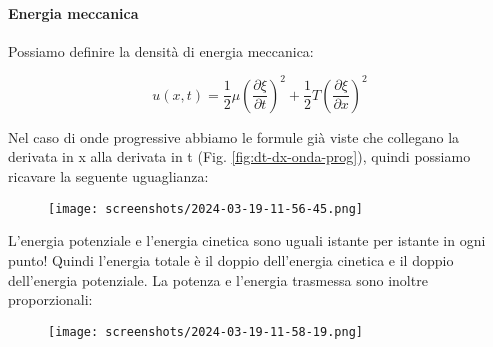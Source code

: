 \paragraph{Energia meccanica}
Possiamo definire la densità di energia meccanica:
\begin{definition}
	\[
		u(x,t) = \frac{1}{2} \mu \left( \frac{\partial \xi }{\partial t}  \right) ^{2} + \frac{1}{2}T\left( \frac{\partial \xi }{\partial x}  \right) ^{2}
	\]
\end{definition}
Nel caso di onde progressive abbiamo le formule già viste che collegano la derivata in x alla derivata in t (Fig. \ref{fig:dt-dx-onda-prog}), quindi possiamo ricavare la seguente uguaglianza:
\begin{figure}[H]
	\centering
	\texttt{[image: screenshots/2024-03-19-11-56-45.png]}
\end{figure}
L'energia potenziale e l'energia cinetica sono uguali istante per istante in ogni punto! Quindi l'energia totale è il doppio dell'energia cinetica e il doppio dell'energia potenziale. La potenza e l'energia trasmessa sono inoltre proporzionali:
\begin{figure}[H]
	\centering
	\texttt{[image: screenshots/2024-03-19-11-58-19.png]}
\end{figure}